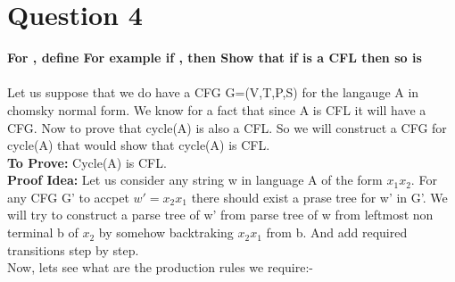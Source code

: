 \documentclass{article}
\begin{document}
\section{Question 4}
\textbf{For , define 
For example if , then 
Show that if  is a CFL then so is } \\
\\
Let us suppose that we do have a CFG G=(V,T,P,S) for the langauge A in chomsky normal form. We know for a fact that since A is CFL it will have a CFG. Now to prove that cycle(A) is also a CFL. So we will construct a CFG for cycle(A) that would show that cycle(A) is CFL. \\
\textbf{To Prove:} Cycle(A) is CFL.\\
\textbf{Proof Idea:} Let us consider any string w in language A of the form $x_1 x_2$. For any CFG G' to accpet $w' = x_2x_1$ there should exist a prase tree for w' in G'. We will try to construct a parse tree of w' from parse tree of w from leftmost non terminal b of $x_2$ by
somehow backtraking $x_2x_1$ from b. And add required transitions step by step.\\
Now, lets see what are the production rules we require:- \\
\end{document}
